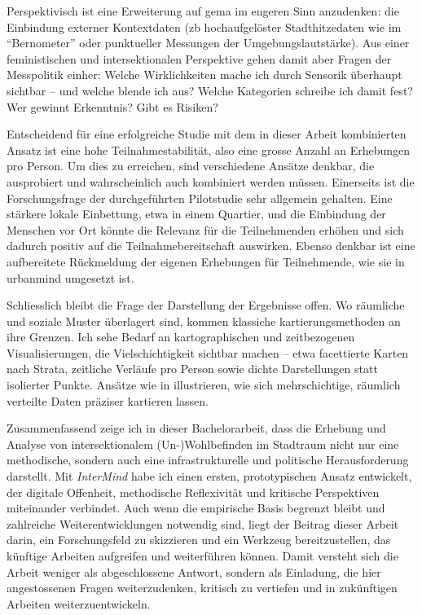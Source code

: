 Perspektivisch ist eine Erweiterung auf \gls{gema} im engeren Sinn anzudenken: die Einbindung externer Kontextdaten (\gls{zb} hochaufgelöster Stadthitzedaten wie im \enquote{Bernometer} \parencite[siehe][]{burgerModellingSpatialPattern2021} oder punktueller Messungen der Umgebungslautstärke). Aus einer feministischen und intersektionalen Perspektive gehen damit aber Fragen der Messpolitik einher: Welche Wirklichkeiten mache ich durch Sensorik überhaupt sichtbar -- und welche blende ich aus? Welche Kategorien schreibe ich damit fest? Wer gewinnt Erkenntnis? Gibt es Risiken?

Entscheidend für eine erfolgreiche Studie mit dem in dieser Arbeit kombinierten Ansatz ist eine hohe Teilnahmestabilität, also eine grosse Anzahl an Erhebungen pro Person. Um dies zu erreichen, sind verschiedene Ansätze denkbar, die ausprobiert und wahrscheinlich auch kombiniert werden müssen. Einerseits ist die Forschungsfrage der durchgeführten Pilotstudie sehr allgemein gehalten. Eine stärkere lokale Einbettung, etwa in einem Quartier, und die Einbindung der Menschen vor Ort könnte die Relevanz für die Teilnehmenden erhöhen und sich dadurch positiv auf die Teilnahmebereitschaft auswirken. Ebenso denkbar ist eine aufbereitete Rückmeldung der eigenen Erhebungen für Teilnehmende, wie sie in \gls{urbanmind} umgesetzt ist.

Schliesslich bleibt die Frage der Darstellung der Ergebnisse offen. Wo räumliche und soziale Muster überlagert sind, kommen klassiche kartierungsmethoden an ihre Grenzen. Ich sehe Bedarf an kartographischen und zeitbezogenen Visualisierungen, die Vielschichtigkeit sichtbar machen -- etwa facettierte Karten nach Strata, zeitliche Verläufe pro Person sowie dichte Darstellungen statt isolierter Punkte. Ansätze wie in \textcite{friebelThermischesEmpfindenUnd2024} illustrieren, wie sich mehrschichtige, räumlich verteilte Daten präziser kartieren lassen.

Zusammenfassend zeige ich in dieser Bachelorarbeit, dass die Erhebung und Analyse von intersektionalem (Un-)Wohlbefinden im Stadtraum nicht nur eine methodische, sondern auch eine infrastrukturelle und politische Herausforderung darstellt. Mit \textit{InterMind} habe ich einen ersten, prototypischen Ansatz entwickelt, der digitale Offenheit, methodische Reflexivität und kritische Perspektiven miteinander verbindet. Auch wenn die empirische Basis begrenzt bleibt und zahlreiche Weiterentwicklungen notwendig sind, liegt der Beitrag dieser Arbeit darin, ein Forschungsfeld zu skizzieren und ein Werkzeug bereitzustellen, das künftige Arbeiten aufgreifen und weiterführen können. Damit versteht sich die Arbeit weniger als abgeschlossene Antwort, sondern als Einladung, die hier angestossenen Fragen weiterzudenken, kritisch zu vertiefen und in zukünftigen Arbeiten weiterzuentwickeln.



